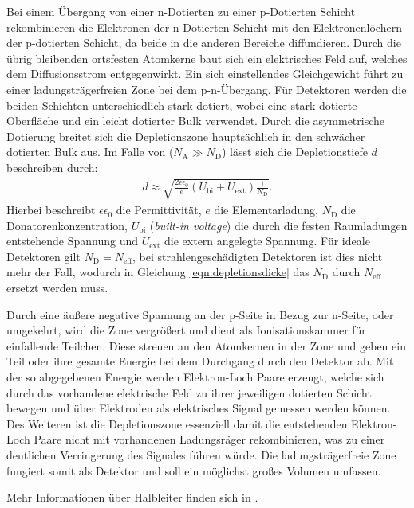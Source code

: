 Bei einem Übergang von einer n-Dotierten zu einer p-Dotierten Schicht rekombinieren
die Elektronen der n-Dotierten Schicht mit den Elektronenlöchern der p-dotierten Schicht, da beide
in die anderen Bereiche diffundieren. Durch die übrig bleibenden ortsfesten Atomkerne
baut sich ein elektrisches Feld auf, welches dem Diffusionsstrom entgegenwirkt.
Ein sich einstellendes Gleichgewicht führt zu einer ladungsträgerfreien Zone bei
dem p-n-Übergang.
Für Detektoren werden die beiden Schichten unterschiedlich stark dotiert, wobei eine
stark dotierte Oberfläche und ein leicht dotierter Bulk verwendet. Durch die asymmetrische
Dotierung breitet sich die Depletionszone hauptsächlich in den schwächer dotierten Bulk aus.
Im Falle von ($N_{\mathrm{A}} \gg N_{\mathrm{D}}$) lässt sich die Depletionstiefe $d$ beschreiben durch:
\begin{align}
  d \approx \sqrt{\frac{2 \epsilon \epsilon_0}{e} (U_{\mathrm{bi}}+U_{\mathrm{ext}})\frac{1}{N_{\mathrm{D}}}}.
  \label{eqn:depletionsdicke}
\end{align}
Hierbei beschreibt $\epsilon \epsilon_0$ die Permittivität, $e$ die Elementarladung, $N_{\mathrm{D}}$ die Donatorenkonzentration, $U_{\mathrm{bi}}$ (\textit{built-in voltage})  die
durch die festen Raumladungen entstehende Spannung und $U_{\mathrm{ext}}$ die extern angelegte Spannung. Für ideale Detektoren gilt $N_{\mathrm{D}} = N_{\mathrm{eff}}$, bei
strahlengeschädigten Detektoren ist dies nicht mehr der Fall, wodurch in Gleichung \ref{eqn:depletionsdicke} das $N_{\mathrm{D}}$ durch $N_{\mathrm{eff}}$ ersetzt werden muss.


Durch eine äußere negative Spannung  an der p-Seite in Bezug zur n-Seite, oder umgekehrt, wird die Zone vergrößert und dient als Ionisationskammer für einfallende Teilchen. Diese streuen
an den Atomkernen in der Zone und geben ein Teil oder ihre gesamte Energie bei dem Durchgang durch den Detektor ab. Mit der so abgegebenen
Energie werden Elektron-Loch Paare erzeugt, welche sich durch das vorhandene elektrische Feld zu ihrer jeweiligen dotierten
Schicht bewegen und über Elektroden als elektrisches Signal gemessen werden können. Des Weiteren ist die Depletionszone essenziell damit
die entstehenden Elektron-Loch Paare nicht mit vorhandenen Ladungsräger rekombinieren, was zu einer deutlichen Verringerung des Signales führen würde.
Die ladungsträgerfreie Zone fungiert somit als Detektor und soll ein möglichst großes Volumen umfassen.

Mehr Informationen über Halbleiter finden sich in  \cite{semiconductor}.

